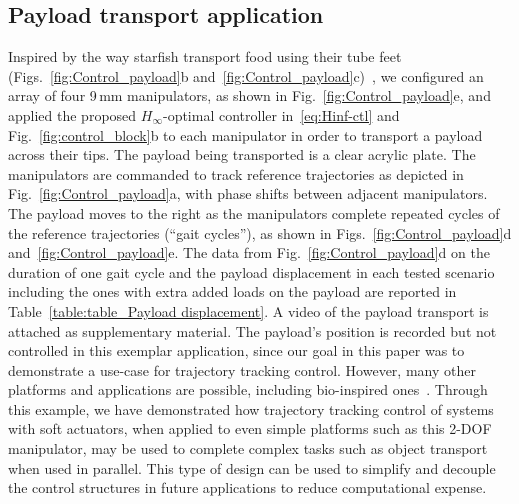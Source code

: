 \subsection{Payload transport application} \label{sec:payload}
Inspired by the way starfish transport food using their tube feet (Figs.~\ref{fig:Control_payload}b and~\ref{fig:Control_payload}c)~\cite{Kerkut1953,Pentreath1970}, we configured an array of four 9\,mm manipulators, as shown in Fig.~\ref{fig:Control_payload}e, and applied the proposed $H_\infty$-optimal controller in~\eqref{eq:Hinf-ctl} and Fig.~\ref{fig:control_block}b to each manipulator in order to transport a payload across their tips. The payload being transported is a clear acrylic plate. The manipulators are commanded to track reference trajectories as depicted in Fig.~\ref{fig:Control_payload}a, with phase shifts between adjacent manipulators. The payload moves to the right as the manipulators complete repeated cycles of the reference trajectories (``gait cycles''), as shown in Figs.~\ref{fig:Control_payload}d and~\ref{fig:Control_payload}e. The data from Fig.~\ref{fig:Control_payload}d on the duration of one gait cycle and the payload displacement in each tested scenario including the ones with extra added loads on the payload are reported in Table~\ref{table:table_Payload displacement}. A video of the payload transport is attached as supplementary material. The payload's position is recorded but not controlled in this exemplar application, since our goal in this paper was to demonstrate a use-case for trajectory tracking control. However, many other platforms and applications are possible, including bio-inspired ones~\cite{Doroudchi2020}. Through this example, we have demonstrated how trajectory tracking control of systems with soft actuators, when applied to even simple platforms such as this 2-DOF manipulator, may be used to complete complex tasks such as object transport when used in parallel. This type of design can be used to simplify and decouple the control structures in future applications to reduce computational expense.

